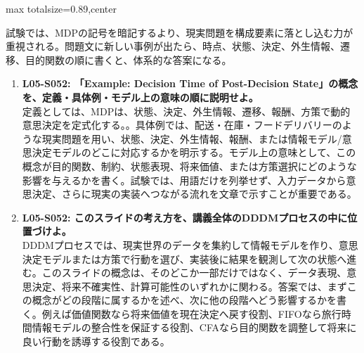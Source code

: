 \begin{minipage}[t]{0.58\textwidth}
\begin{adjustbox}{max totalsize={\textwidth}{0.89\textheight},center}
\begin{minipage}{\textwidth}
試験では、MDPの記号を暗記するより、現実問題を構成要素に落とし込む力が重視される。問題文に新しい事例が出たら、時点、状態、決定、外生情報、遷移、目的関数の順に書くと、体系的な答案になる。\par{}\begin{enumerate}\item \textbf{L05-S052: 「Example: Decision Time of Post-Decision State」の概念を、定義・具体例・モデル上の意味の順に説明せよ。}\\定義としては、MDPは、状態、決定、外生情報、遷移、報酬、方策で動的意思決定を定式化する。。具体例では、配送・在庫・フードデリバリーのような現実問題を用い、状態、決定、外生情報、報酬、または情報モデル/意思決定モデルのどこに対応するかを明示する。モデル上の意味として、この概念が目的関数、制約、状態表現、将来価値、または方策選択にどのような影響を与えるかを書く。試験では、用語だけを列挙せず、入力データから意思決定、さらに現実の実装へつながる流れを文章で示すことが重要である。\item \textbf{L05-S052: このスライドの考え方を、講義全体のDDDMプロセスの中に位置づけよ。}\\DDDMプロセスでは、現実世界のデータを集約して情報モデルを作り、意思決定モデルまたは方策で行動を選び、実装後に結果を観測して次の状態へ進む。このスライドの概念は、そのどこか一部だけではなく、データ表現、意思決定、将来不確実性、計算可能性のいずれかに関わる。答案では、まずこの概念がどの段階に属するかを述べ、次に他の段階へどう影響するかを書く。例えば価値関数なら将来価値を現在決定へ戻す役割、FIFOなら旅行時間情報モデルの整合性を保証する役割、CFAなら目的関数を調整して将来に良い行動を誘導する役割である。\end{enumerate}
\end{minipage}
\end{adjustbox}
\end{minipage}


